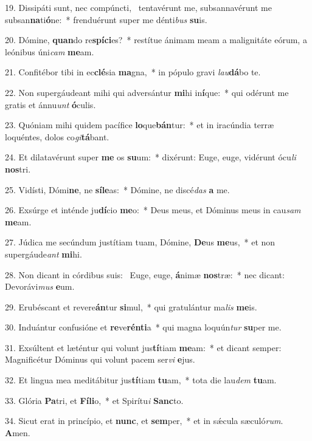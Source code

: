 19. Dissipáti sunt, nec compúncti, \dag\  tentavérunt me, subsannavérunt me subsan\textbf{na}ti\textbf{ó}ne:~*  frenduérunt super me dénti\textit{bus} \textbf{su}is.\

20. Dómine, \textbf{quan}do re\textbf{spí}\textbf{ci}es?~*  restítue ánimam meam a malignitáte eórum, a leónibus úni\textit{cam} \textbf{me}am.\

21. Confitébor tibi in ec\textbf{clé}sia \textbf{ma}gna,~*  in pópulo gravi \textit{lau}\textbf{dá}bo te.\

22. Non supergáudeant mihi qui adversántur \textbf{mi}hi in\textbf{í}que:~*  qui odérunt me gratis et ánnu\textit{unt} \textbf{ó}culis.\

23. Quóniam mihi quidem pacífice \textbf{lo}que\textbf{bán}tur:~*  et in iracúndia terræ loquéntes, dolos co\textit{gi}\textbf{tá}bant.\

24. Et dilatavérunt super \textbf{me} os \textbf{su}um:~*  dixérunt: Euge, euge, vidérunt ócu\textit{li} \textbf{nos}tri.\

25. Vidísti, Dómi\textbf{ne}, ne \textbf{sí}\textbf{le}as:~*  Dómine, ne discé\textit{das} \textbf{a} me.\

26. Exsúrge et inténde ju\textbf{dí}cio \textbf{me}o:~*  Deus meus, et Dóminus meus in cau\textit{sam} \textbf{me}am.\

27. Júdica me secúndum justítiam tuam, Dómine, \textbf{De}us \textbf{me}us,~*  et non supergáude\textit{ant} \textbf{mi}hi.\

28. Non dicant in córdibus suis: \dag\  Euge, euge, \textbf{á}nimæ \textbf{nos}træ:~*  nec dicant: Devorávi\textit{mus} \textbf{e}um.\

29. Erubéscant et revere\textbf{án}tur \textbf{si}mul,~*  qui gratulántur ma\textit{lis} \textbf{me}is.\

30. Induántur confusióne et \textbf{re}ve\textbf{rén}\textbf{ti}a~*  qui magna loquún\textit{tur} \textbf{su}per me.\

31. Exsúltent et læténtur qui volunt jus\textbf{tí}tiam \textbf{me}am:~*  et dicant semper: Magnificétur Dóminus qui volunt pacem ser\textit{vi} \textbf{e}jus.\

32. Et lingua mea meditábitur jus\textbf{tí}tiam \textbf{tu}am,~*  tota die lau\textit{dem} \textbf{tu}am.\

33. Glória \textbf{Pa}tri, et \textbf{Fí}\textbf{li}o,~*  et Spirítu\textit{i} \textbf{Sanc}to.\

34. Sicut erat in princípio, et \textbf{nunc}, et \textbf{sem}per,~*  et in sǽcula sæculó\textit{rum}. \textbf{A}men.\

